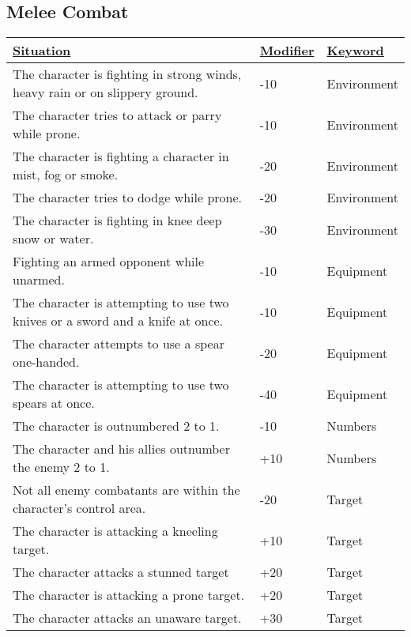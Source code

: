 \subsection{Melee Combat}
\begin{tabularx}{\textwidth}{|X|l|l|}
	\hline
	\ul{Situation} & \ul{Modifier} & \ul{Keyword} \\ \hline
	The character is fighting in strong winds, heavy rain or on slippery ground. & -10 & Environment \\ \hline
	The character tries to attack or parry while prone. & -10 & Environment \\ \hline
	The character is fighting a character in mist, fog or smoke. & -20 & Environment \\ \hline
	The character tries to dodge while prone. & -20 & Environment \\ \hline
	The character is fighting in knee deep snow or water. & -30 & Environment \\ \hline
	Fighting an armed opponent while unarmed. & -10 & Equipment \\ \hline
	The character is attempting to use two knives or a sword and a knife at once. & -10 & Equipment \\ \hline
	The character attempts to use a spear one-handed. & -20 & Equipment \\ \hline
	The character is attempting to use two spears at once. & -40 & Equipment \\ \hline
	The character is outnumbered 2 to 1. & -10 & Numbers \\ \hline
	The character and his allies outnumber the enemy 2 to 1. & +10 & Numbers \\ \hline
	Not all enemy combatants are within the character's control area. & -20 & Target \\ \hline
	The character is attacking a kneeling target. & +10 & Target \\ \hline
	The character attacks a stunned target & +20 & Target \\ \hline
	The character is attacking a prone target. & +20 & Target \\ \hline
	The character attacks an unaware target. & +30 & Target \\ \hline
\end{tabularx}
